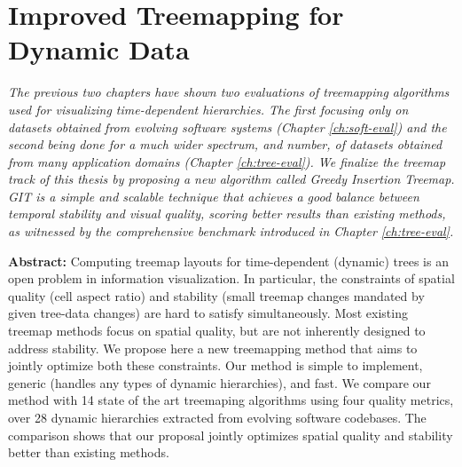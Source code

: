 \chapter{Improved Treemapping for Dynamic Data}
\label{ch:git}


\textit{
The previous two chapters have shown two evaluations of treemapping algorithms used for visualizing time-dependent hierarchies. The first focusing only on datasets obtained from evolving software systems (Chapter \ref{ch:soft-eval}) and the second being done for a much wider spectrum, and number, of datasets obtained from many application domains (Chapter \ref{ch:tree-eval}).
We finalize the treemap track of this thesis by proposing a new algorithm called \emph{Greedy Insertion Treemap}. GIT is a simple and scalable technique that achieves a good balance between temporal stability and visual quality, scoring better results than existing methods, as witnessed by the comprehensive benchmark introduced in Chapter \ref{ch:tree-eval}. 
}

\vspace{5mm} %

\noindent \textbf{Abstract:}
Computing treemap layouts for time-dependent (dynamic) trees is an open problem in information visualization. In particular, the constraints of spatial quality (cell aspect ratio) and stability (small treemap changes mandated by given tree-data changes) are hard to satisfy simultaneously. Most existing treemap methods focus on spatial quality, but are not inherently designed to address stability. We propose here a new treemapping method that aims to jointly optimize both these constraints. Our method is simple to implement, generic (handles any types of dynamic hierarchies), and fast. We compare our method with 14 state of the art treemaping algorithms using four quality metrics, over 28 dynamic hierarchies extracted from evolving software codebases. The comparison shows that our proposal jointly optimizes spatial quality and stability better than existing methods.


